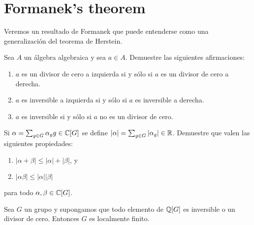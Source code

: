 \section*{Formanek's theorem}

Veremos un resultado de Formanek que puede entenderse como una generalización
del teorema de Herstein. 

\begin{exercise}
	Sea $A$ un álgebra algebraica y sea $a\in A$. Demuestre las siguientes
	afirmaciones:
	\begin{enumerate}
		\item $a$ es un divisor de cero a izquierda si y sólo si $a$ es un
			divisor de cero a derecha.
		\item $a$ es inversible a izquierda si y sólo si $a$ es inversible a
			derecha.
		\item $a$ es inversible si y sólo si $a$ no es un divisor de cero.
	\end{enumerate}
\end{exercise}


\begin{exercise}
	\label{exa:norma}
	Si $\alpha=\sum_{g\in G}\alpha_gg\in\mathbb{C}[G]$ se define $|\alpha|=\sum_{g\in
	G}|\alpha_g|\in\mathbb{R}$. Demuestre que valen las siguientes propiedades:
	\begin{enumerate}
		\item $|\alpha+\beta|\leq|\alpha|+|\beta|$, y 
		\item $|\alpha\beta|\leq|\alpha||\beta|$ 
	\end{enumerate}
	para todo $\alpha,\beta\in\mathbb{C}[G]$.
\end{exercise}

\begin{theorem}
	\label{thm:FormanekQ}
	Sea $G$ un grupo y supongamos que todo elemento de $\mathbb{Q}[G]$ es inversible o
	un divisor de cero. Entonces $G$ es localmente finito.
\end{theorem}

